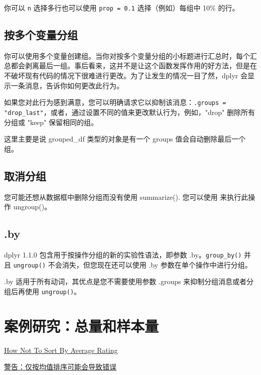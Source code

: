 你可以 \verb|n| 选择多行也可以使用 \verb|prop = 0.1| 选择（例如）每组中 10\% 的行。

\subsection{按多个变量分组}
你可以使用多个变量创建组。当你对按多个变量分组的小标题进行汇总时，每个汇总都会剥离最后一组。事后看来，这并不是让这个函数发挥作用的好方法，但是在不破坏现有代码的情况下很难进行更改。为了让发生的情况一目了然，dplyr 会显示一条消息，告诉你如何更改此行为。

如果您对此行为感到满意，您可以明确请求它以抑制该消息：\verb|.groups = "drop_last"|，或者，通过设置不同的值来更改默认行为，例如，"drop" 删除所有分组或 "keep" 保留相同的组。

\begin{tcolorbox}
    这里主要是说 grouped\_df 类型的对象是有一个 groups 值会自动删除最后一个组。
\end{tcolorbox}
\subsection{取消分组}
您可能还想从数据框中删除分组而没有使用 summarize(). 您可以使用 来执行此操作 ungroup()。
\subsection{.by}
dplyr 1.1.0 包含用于按操作分组的新的实验性语法，即参数 .by。\verb|group_by()| 并且 \verb|ungroup()| 不会消失，但您现在还可以使用 .by 参数在单个操作中进行分组。

.by 适用于所有动词，其优点是您不需要使用参数 .groups 来抑制分组消息或者分组后再使用 \verb|ungroup()|。

\section{案例研究：总量和样本量}
\href{https://www.evanmiller.org/how-not-to-sort-by-average-rating.html}{How Not To Sort By Average Rating}

\href{https://github.com/JPL-JUNO/Data-Analysis-and-Science/blob/main/R4DS/code/ch02/case_study.R}{警告：仅按均值排序可能会导致错误}